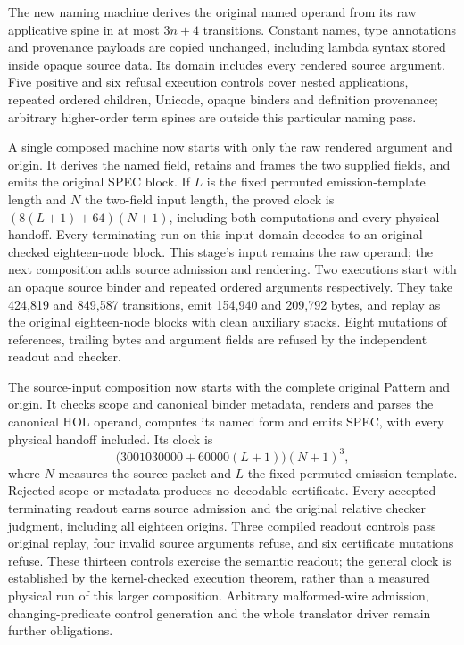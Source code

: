 \documentclass[11pt]{article}
\begin{document}
The new naming machine derives the original named operand from its raw
applicative spine in at most $3n+4$ transitions. Constant names, type
annotations and provenance payloads are copied unchanged, including lambda
syntax stored inside opaque source data. Its domain includes every rendered
source argument. Five positive and six refusal execution controls cover
nested applications, repeated ordered children, Unicode, opaque binders and
definition provenance; arbitrary higher-order term spines are outside this
particular naming pass.

A single composed machine now starts with only the raw rendered argument
and origin. It derives the named field, retains and frames the two supplied
fields, and emits the original SPEC block. If $L$ is the fixed permuted
emission-template length and $N$ the two-field input length, the proved
clock is $(8(L+1)+64)(N+1)$, including both computations and every physical
handoff. Every terminating run on this input domain decodes to an original
checked eighteen-node block. This stage's input remains the raw operand;
the next composition adds source admission and rendering.
Two executions start with an opaque source binder and repeated ordered
arguments respectively. They take 424,819 and 849,587 transitions, emit
154,940 and 209,792 bytes, and replay as the original eighteen-node blocks
with clean auxiliary stacks. Eight mutations of references, trailing bytes
and argument fields are refused by the independent readout and checker.

The source-input composition now starts with the complete original Pattern
and origin. It checks scope and canonical binder metadata, renders and parses
the canonical HOL operand, computes its named form and emits SPEC, with every
physical handoff included. Its clock is
\[
  \bigl(3001030000 + 60000(L+1)\bigr)(N+1)^3,
\]
where $N$ measures the source packet and $L$ the fixed permuted emission
template. Rejected scope or metadata produces no decodable certificate.
Every accepted terminating readout earns source admission and the original
relative checker judgment, including all eighteen origins. Three compiled
readout controls pass original replay, four invalid source arguments refuse,
and six certificate mutations refuse. These thirteen controls exercise the
semantic readout; the general clock is established by the kernel-checked
execution theorem, rather than a measured physical run of this larger
composition. Arbitrary malformed-wire admission, changing-predicate control
generation and the whole translator driver remain further obligations.
\end{document}
